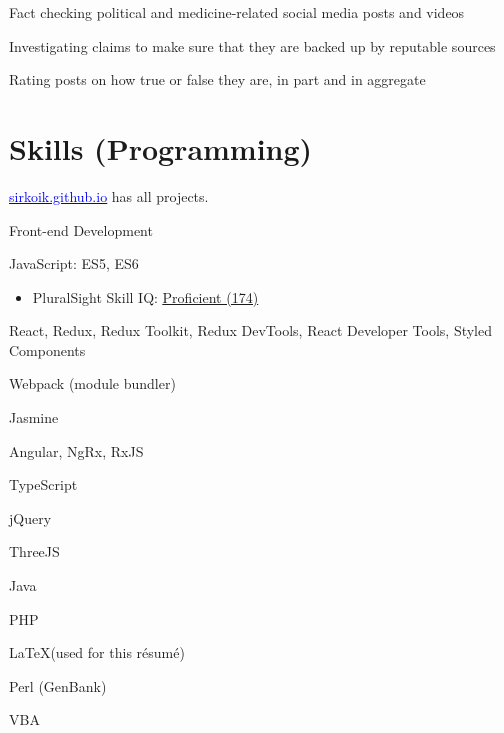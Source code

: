 \documentclass[]{deedy-resume-openfont}
\begin{document}
\descript{}
\begin{tightemize}
\item Fact checking political and medicine-related social media posts and videos
\item Investigating claims to make sure that they are backed up by reputable sources
\item Rating posts on how true or false they are, in part and in aggregate
\end{tightemize}
\sectionsep

\newpage

\section{Skills (Programming)}
\descript{}
\begin{tightemize}
\item \href{https://sirkoik.github.io#projects}{\underline{\textcolor{blue}{sirkoik.github.io}}} has all projects.
\end{tightemize}
\sectionsep

\descript{}
\begin{tightemize}
\item Front-end Development\footnotemark[\value{footnote}]
\end{tightemize}
\sectionsep

\descript{}
\begin{tightemize}
\item JavaScript\footnotemark[\value{footnote}]: ES5, ES6
\begin{itemize}
\item PluralSight Skill IQ: \href{https://app.pluralsight.com/profile/alexander-koik-cesto}{\underline{Proficient (174)}}
\end{itemize}
\item React\footnotemark[\value{footnote}], Redux, Redux Toolkit, Redux DevTools, React Developer Tools, Styled Components
\item Webpack (module bundler)
\item Jasmine
\item Angular\footnotemark[\value{footnote}], NgRx, RxJS
\item TypeScript
\item jQuery\footnotemark[\value{footnote}]
\item ThreeJS
\item Java
\item PHP\footnotemark[\value{footnote}]
\item \LaTeX \xspace (used for this r\'esum\'e)
\item Perl (GenBank)
\item VBA\footnotemark[\value{footnote}]
\end{tightemize}
\sectionsep
\end{document}
